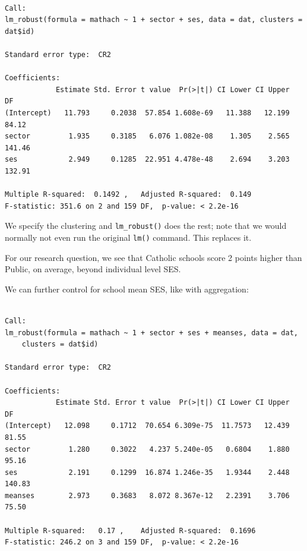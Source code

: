 \documentclass[
  letterpaper,
  DIV=11,
  numbers=noendperiod]{scrreprt}
\newenvironment{Shaded}{\begin{snugshade}}{\end{snugshade}}
\newcommand{\AttributeTok}[1]{\textcolor[rgb]{0.49,0.56,0.16}{#1}}
\newcommand{\DecValTok}[1]{\textcolor[rgb]{0.25,0.63,0.44}{#1}}
\newcommand{\FunctionTok}[1]{\textcolor[rgb]{0.02,0.16,0.49}{#1}}
\newcommand{\NormalTok}[1]{\textcolor[rgb]{0.00,0.44,0.13}{#1}}
\newcommand{\OtherTok}[1]{\textcolor[rgb]{0.00,0.44,0.13}{#1}}
\newcommand{\SpecialCharTok}[1]{\textcolor[rgb]{0.25,0.44,0.63}{#1}}
\begin{document}
\begin{verbatim}

Call:
lm_robust(formula = mathach ~ 1 + sector + ses, data = dat, clusters = dat$id)

Standard error type:  CR2 

Coefficients:
            Estimate Std. Error t value  Pr(>|t|) CI Lower CI Upper     DF
(Intercept)   11.793     0.2038  57.854 1.608e-69   11.388   12.199  84.12
sector         1.935     0.3185   6.076 1.082e-08    1.305    2.565 141.46
ses            2.949     0.1285  22.951 4.478e-48    2.694    3.203 132.91

Multiple R-squared:  0.1492 ,   Adjusted R-squared:  0.149 
F-statistic: 351.6 on 2 and 159 DF,  p-value: < 2.2e-16
\end{verbatim}

We specify the clustering and \texttt{lm\_robust()} does the rest; note
that we would normally not even run the original \texttt{lm()} command.
This replaces it.

For our research question, we see that Catholic schools score 2 points
higher than Public, on average, beyond individual level SES.

We can further control for school mean SES, like with aggregation:

\begin{Shaded}
\end{Shaded}

\begin{verbatim}

Call:
lm_robust(formula = mathach ~ 1 + sector + ses + meanses, data = dat, 
    clusters = dat$id)

Standard error type:  CR2 

Coefficients:
            Estimate Std. Error t value  Pr(>|t|) CI Lower CI Upper     DF
(Intercept)   12.098     0.1712  70.654 6.309e-75  11.7573   12.439  81.55
sector         1.280     0.3022   4.237 5.240e-05   0.6804    1.880  95.16
ses            2.191     0.1299  16.874 1.246e-35   1.9344    2.448 140.83
meanses        2.973     0.3683   8.072 8.367e-12   2.2391    3.706  75.50

Multiple R-squared:   0.17 ,    Adjusted R-squared:  0.1696 
F-statistic: 246.2 on 3 and 159 DF,  p-value: < 2.2e-16
\end{verbatim}
\end{document}
